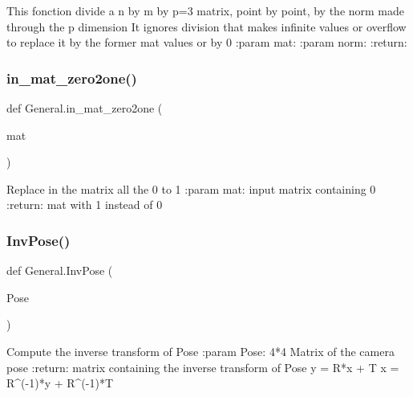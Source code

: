 \begin{DoxyVerb}This fonction divide a n by m by p=3 matrix, point by point, by the norm made through the p dimension
It ignores division that makes infinite values or overflow to replace it by the former mat values or by 0
:param mat:
:param norm:
:return:
\end{DoxyVerb}
 \mbox{\label{namespace_general_a9fafbff15974c6b9a6032e6f5b568808}} 
\subsubsection{\texorpdfstring{in\+\_\+mat\+\_\+zero2one()}{in\_mat\_zero2one()}}
{\footnotesize\ttfamily def General.\+in\+\_\+mat\+\_\+zero2one (\begin{DoxyParamCaption}\item[{}]{mat }\end{DoxyParamCaption})}

\begin{DoxyVerb}Replace in the matrix all the 0 to 1
:param mat: input matrix containing 0
:return:  mat with 1 instead of 0
\end{DoxyVerb}
 \mbox{\label{namespace_general_a7fb8753b34ce7bd6133dda90add3aa73}} 
\subsubsection{\texorpdfstring{Inv\+Pose()}{InvPose()}}
{\footnotesize\ttfamily def General.\+Inv\+Pose (\begin{DoxyParamCaption}\item[{}]{Pose }\end{DoxyParamCaption})}

\begin{DoxyVerb}Compute the inverse transform of Pose
:param Pose: 4*4 Matrix of the camera pose
:return: matrix containing the inverse transform of Pose
y = R*x + T
x = R^(-1)*y + R^(-1)*T
\end{DoxyVerb}
 \mbox{\label{namespace_general_aafcc697815eaa5f02073a65381657756}} 
